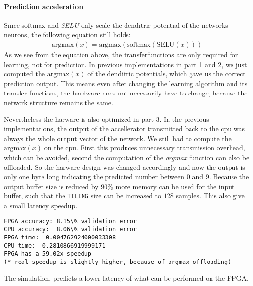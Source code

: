 \documentclass[../main.tex]{subfiles}
\begin{document}
\paragraph{Prediction acceleration}
Since softmax and \textit{SELU} only scale the denditric potential of the networks neurons, the following equation still holds:
\begin{align*}
	\text{argmax}(x) = \text{argmax}(\text{softmax}(\text{SELU}(x)))
\end{align*}
As we see from the equation above, the transferfunctions are only required for learning, not for prediction.
In previous implementations in part 1 and 2, we just computed the $\text{argmax}(x)$ of the denditric potentials, which gave us the correct prediction output. 
This means even after changing the learning algorithm and its transfer functions, the hardware does not necessarily have to change, because the network structure remains the same. 

Nevertheless the harware is also optimized in part 3. 
In the previous implementations, the output of the accellerator transmitted back to the cpu was always the whole output vector of the network. 
We still had to compute the $\text{argmax}(x)$  on the cpu. First this produces unnecessary transmission overhead, which can be avoided, second the computation of the \textit{argmax} function can also be offloaded. So the harware design was changed accordingly and now the output is only one byte long indicating the predicted number between 0 and 9. Because the output buffer size is reduced by $90\si{\percent}$ more memory can be used for the input buffer, such that the \texttt{TILING} size can be increased to $128$ samples. This also give a small latency speedup.

\begin{lstlisting}
FPGA accuracy: 8.15\% validation error
CPU accuracy:  8.06\% validation error
FPGA time:  0.004762924000033308
CPU time:  0.2810866919999171
FPGA has a 59.02x speedup 
(* real speedup is slightly higher, because of argmax offloading)
\end{lstlisting}

The simulation, predicts a lower latency of what can be performed on the FPGA.
\end{document}

